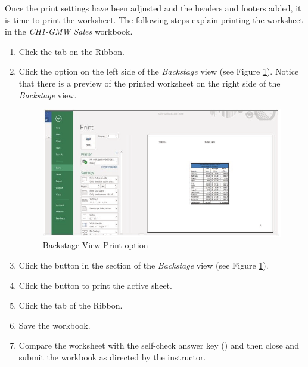 Once the print settings have been adjusted and the headers and footers added, it is time to print the worksheet. The following steps explain printing the worksheet in the \textit{CH1-GMW Sales} workbook.

\begin{enumbox}
	\begin{enumerate}
		\item Click the  tab on the Ribbon.
		\item Click the  option on the left side of the \textit{Backstage} view (see Figure \ref{01:fig52}). Notice that there is a preview of the printed worksheet on the right side of the \textit{Backstage} view.

		\begin{figure}[H]
			\centering
			\includegraphics[width=\maxwidth{.95\linewidth}]{gfx/ch01_fig52}
			\caption{Backstage View Print option}
			\label{01:fig52}
		\end{figure}

		\item Click the  button in the  section of the \textit{Backstage} view (see Figure \ref{01:fig52}).
		\item Click the  button to print the active sheet.
		\item Click the  tab of the Ribbon.
		\item Save the  workbook.
		\item Compare the worksheet with the self-check answer key () and then close and submit the  workbook as directed by the instructor.
	\end{enumerate}
\end{enumbox}
	
